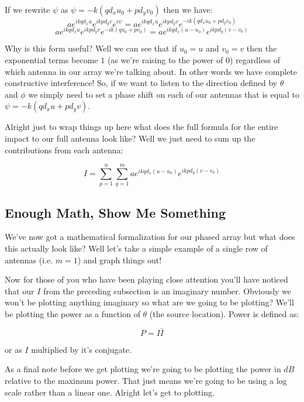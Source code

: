 \documentclass[10pt,a4paper]{article}
\begin{document}
If we rewrite $\psi$ as $\psi = -k(qd_xu_0+pd_yv_0)$ then we have:
\begin{equation}
ae^{ikqd_xu}e^{ikpd_yv}e^{i\psi}=ae^{ikqd_xu}e^{ikpd_yv}e^{-ik(qd_xu_0+pd_yv_0)}
\end{equation}
\begin{equation}
ae^{ikqd_xu}e^{ikpd_yv}e^{-ik(qu_0+pv_0)}= ae^{ikqd_x(u-u_0)}e^{ikpd_y(v-v_0)}
\end{equation}

Why is this form useful? Well we can see that if $u_0=u$ and $v_0=v$ then the exponential terms become $1$ (as we're raising to the power of 0) regardless of which antenna in our array we're talking about. In other words we have complete constructive interference! So, if we want to listen to the direction defined by $\theta$ and $\phi$ we simply need to set a phase shift on each of our antennas that is equal to $\psi = -k(qd_xu+pd_yv)$.

Alright just to wrap things up here what does the full formula for the entire impact to our full antenna look like? Well we just need to sum up the contributions from each antenna:

\begin{equation}
I=\sum_{p=1}^n \sum_{q=1}^m  ae^{ikqd_x(u-u_0)}e^{ikpd_y(v-v_0)}
\end{equation}



\subsection{Enough Math, Show Me Something}
We've now got a mathematical formalization for our phased array but what does this actually look like? Well let's take a simple example of a single row of antennas (i.e. $m=1$) and graph things out!

Now for those of you who have been playing close attention you'll have noticed that our $I$ from the preceding subsection is an imaginary number. Obviously we won't be plotting anything imaginary so what are we going to be plotting? We'll be plotting the power as a function of $\theta$ (the source location). Power is defined as:

\begin{equation}
P=I\bar{I}
\end{equation}

or as $I$ multiplied by it's conjugate. 

As a final note before we get plotting we're going to be plotting the power in $dB$ relative to the maximum power. That just means we're going to be using a log scale rather than a linear one. Alright let's get to plotting.
\end{document}
